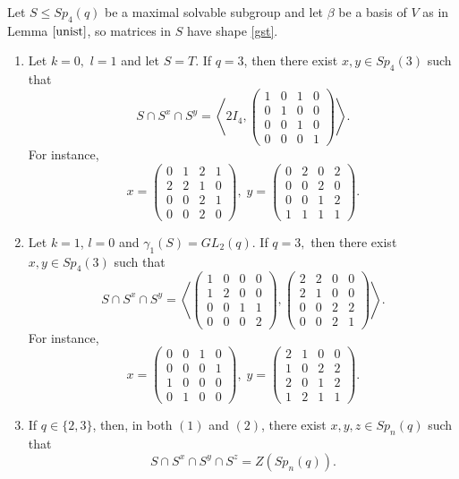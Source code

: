 \begin{Lem}\label{Spq2c23}
Let  $S \le Sp_4(q)$ be a maximal solvable subgroup and let $\beta$ be a basis of $V$ as in Lemma $\ref{unist}$, so matrices in $S$ have shape \eqref{gst}. 
\begin{enumerate}[font=\normalfont]
\item Let $k=0,$ $l=1$ and let $S=T$. If $q=3$, then there exist $x,y \in Sp_4(3)$ such that 
$$S \cap S^x \cap S^y = \left\langle 2I_4, \left( \begin{smallmatrix}
1&0&1&0\\
0&1&0&0\\
0&0&1&0\\
0&0&0&1
\end{smallmatrix} \right)
 \right\rangle.$$ For instance,  $$x=\left( \begin{smallmatrix}
0&1&2&1\\
2&2&1&0\\
0&0&2&1\\
0&0&2&0
\end{smallmatrix} \right), \;  y=\left( \begin{smallmatrix}
0&2&0&2\\
0&0&2&0\\
0&0&1&2\\
1&1&1&1
\end{smallmatrix} \right).$$
\item Let $k=1$, $l=0$ and $\gamma_1(S)=GL_2(q).$ If $q=3,$ then there exist $x,y \in Sp_4(3)$ such that 
$$S \cap S^x \cap S^y = \left\langle \left( \begin{smallmatrix}
1&0&0&0\\
1&2&0&0\\
0&0&1&1\\
0&0&0&2
\end{smallmatrix} \right), \left( \begin{smallmatrix}
2&2&0&0\\
2&1&0&0\\
0&0&2&2\\
0&0&2&1
\end{smallmatrix} \right)
 \right\rangle.$$ For instance,  $$x=\left( \begin{smallmatrix}
0&0&1&0\\
0&0&0&1\\
1&0&0&0\\
0&1&0&0
\end{smallmatrix} \right), \;  y=\left( \begin{smallmatrix}
2&1&0&0\\
1&0&2&2\\
2&0&1&2\\
1&2&1&1
\end{smallmatrix} \right).$$
\item If $q \in \{2,3\}$, then, in both  $(1)$ and $(2)$, there exist $x,y,z \in Sp_n(q)$ such that 
$$S \cap S^x \cap S^y \cap S^z =Z(Sp_n(q)).$$ 
\end{enumerate}
\end{Lem}


